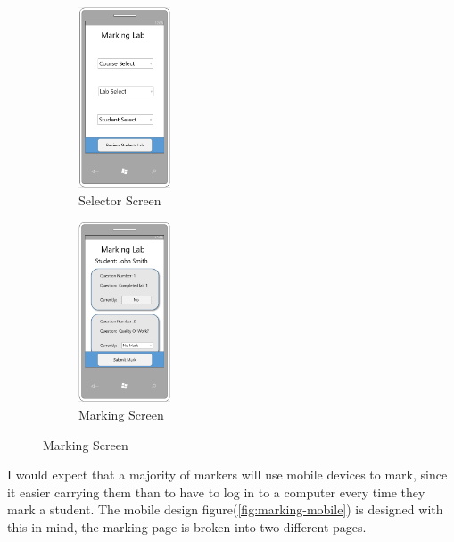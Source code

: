 \documentclass[11pt]{report}
\begin{document}
\begin{figure}[H]
\caption{Marking Page: Mobile Designs}
\label{fig:marking-mobile}
\centering
\begin{subfigure}[c]{0.45\textwidth}
    \centering
    \includegraphics[width=0.3\textwidth]{images/design/marking-select-mobile.png}
    \caption{Selector Screen}
    \label{fig:design-marking-select-mb}
\end{subfigure}
\hfill
\begin{subfigure}[c]{0.45\textwidth}
    \centering
    \includegraphics[width=0.3\textwidth]{images/design/marking-mobile.png}
    \caption{Marking Screen}
    \label{fig:design-marking-mb}
\end{subfigure}
\end{figure}

I would expect that a majority of markers will use mobile devices to mark, since it easier carrying  them than to have to log in to a computer every time they mark a student. The mobile design figure(\ref{fig:marking-mobile}) is designed with this in mind, the marking page is broken into two different pages.
\end{document}
